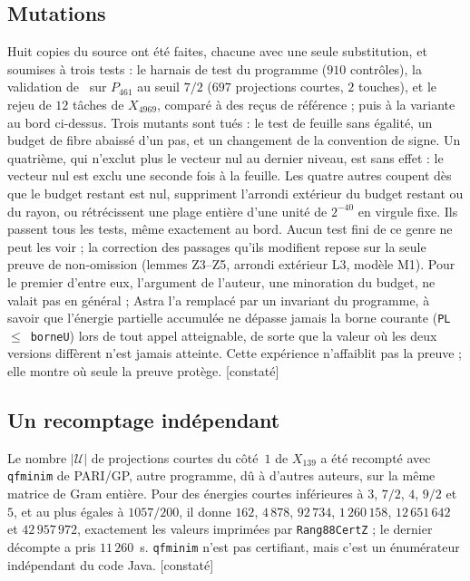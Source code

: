 \documentclass[11pt,a4paper]{amsart}
\theoremstyle{plain}
\theoremstyle{definition}
\newcommand{\Uc}{\mathcal{U}}
\newcommand{\st}[1]{\textup{\textsf{\small[#1]}}}
\newcommand{\CONS}{\st{constaté}}
\begin{document}
\subsection{Mutations}
Huit copies du source ont été faites, chacune avec une seule substitution, et soumises à trois tests : le harnais de test du programme ($910$ contrôles), la validation de~\cite[\S5.2]{Gau26} sur $P_{461}$ au seuil $7/2$ ($697$ projections courtes, $2$ touches), et le rejeu de $12$ tâches de $X_{4969}$, comparé à des reçus de référence ; puis à la variante au bord ci-dessus. Trois mutants sont tués : le test de feuille sans égalité, un budget de fibre abaissé d'un pas, et un changement de la convention de signe. Un quatrième, qui n'exclut plus le vecteur nul au dernier niveau, est sans effet : le vecteur nul est exclu une seconde fois à la feuille. Les quatre autres coupent dès que le budget restant est nul, suppriment l'arrondi extérieur du budget restant ou du rayon, ou rétrécissent une plage entière d'une unité de $2^{-40}$ en virgule fixe. Ils passent tous les tests, même exactement au bord. Aucun test fini de ce genre ne peut les voir ; la correction des passages qu'ils modifient repose sur la seule preuve de non-omission (lemmes Z3--Z5, arrondi extérieur L3, modèle M1). Pour le premier d'entre eux, l'argument de l'auteur, une minoration du budget, ne valait pas en général ; Astra l'a remplacé par un invariant du programme, à savoir que l'énergie partielle accumulée ne dépasse jamais la borne courante (\texttt{PL}~$\le$~\texttt{borneU}) lors de tout appel atteignable, de sorte que la valeur où les deux versions diffèrent n'est jamais atteinte. Cette expérience n'affaiblit pas la preuve ; elle montre où seule la preuve protège. \CONS

\subsection{Un recomptage indépendant}
Le nombre $|\Uc|$ de projections courtes du côté~$1$ de $X_{139}$ a été recompté avec \texttt{qfminim} de PARI/GP, autre programme, dû à d'autres auteurs, sur la même matrice de Gram entière. Pour des énergies courtes inférieures à $3$, $7/2$, $4$, $9/2$ et $5$, et au plus égales à $1057/200$, il donne $162$, $4\,878$, $92\,734$, $1\,260\,158$, $12\,651\,642$ et $42\,957\,972$, exactement les valeurs imprimées par \texttt{Rang88CertZ} ; le dernier décompte a pris $11\,260$~s. \texttt{qfminim} n'est pas certifiant, mais c'est un énumérateur indépendant du code Java. \CONS
\end{document}
